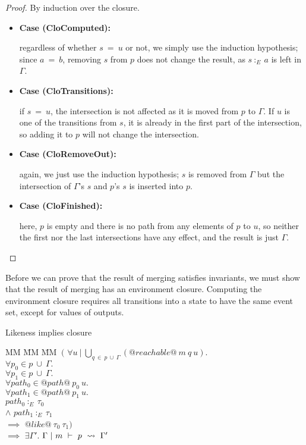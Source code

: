 \begin{proof}
By induction over the closure.

\begin{itemize}
\item \textbf{Case (CloComputed):}

regardless of whether $s~=~u$ or not, we simply use the induction hypothesis; since $a~=~b$, removing $s$ from $p$ does not change the result, as $s~:_E~a$ is left in $\Gamma$.

\item \textbf{Case (CloTransitions):}

if $s~=~u$, the intersection is not affected as it is moved from $p$ to $\Gamma$.
If $u$ is one of the transitions from $s$, it is already in the first part of the intersection, so adding it to $p$ will not change the intersection.

\item \textbf{Case (CloRemoveOut):}

again, we just use the induction hypothesis;
$s$ is removed from $\Gamma$ but the intersection of $\Gamma$'s $s$ and $p$'s $s$ is inserted into $p$.


\item \textbf{Case (CloFinished):}

here, $p$ is empty and there is no path from any elements of $p$ to $u$, so neither the first nor the last intersections have any effect, and the result is just $\Gamma$.
\end{itemize}

\end{proof}

Before we can prove that the result of merging satisfies invariants, we must show that the result of merging has an environment closure.
Computing the environment closure requires all transitions into a state to have the same event set, except for values of outputs.

\begin{lemma}
Likeness implies closure
\begin{tabbing}
MM \= MM \= MM \kill
 $~($
\> $\forall u ~|~ \bigcup_{q~\in~p~\cup~\Gamma}(@reachable@~m~q~u).$ \\
\> $\forall p_0 \in p~\cup~\Gamma.$ \\
\> $\forall p_1 \in p~\cup~\Gamma.$ \\
\> $\forall path_0 \in @path@~p_0~u.$ \\
\> $\forall path_1 \in @path@~p_1~u.$ \\
\> \> $path_0~:_E~\tau_0$ \\
\> $\wedge$ \> $path_1~:_E~\tau_1$ \\
\> $\implies$ \> $@like@~\tau_0~\tau_1)$ \\
$\implies$ \> $\exists \Gamma'.$ \> $\Gamma ~|~ m ~\vdash~ p ~\rightsquigarrow~ \Gamma'$ \\
\end{tabbing}
\end{lemma}

